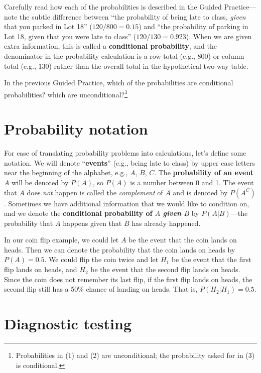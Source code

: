 \documentclass[
  10pt,
  openany]{book}
\theoremstyle{definition}
\theoremstyle{definition}
\theoremstyle{definition}
\theoremstyle{definition}
\theoremstyle{remark}
\begin{document}
Carefully read how each of the probabilities is described in the Guided Practice---note the subtle difference between ``the probability of being late to class, \emph{given} that you parked in Lot 18'' (\(120/800 = 0.15\)) and ``the probability of parking in Lot 18, given that you were late to class'' (\(120/130 = 0.923\)). When we are given extra information, this is called a \textbf{conditional probability}, and the denominator in the probability calculation is a row total (e.g., 800) or column total (e.g., 130) rather than the overall total in the hypothetical two-way table.

In the previous Guided Practice, which of the probabilities are conditional probabilities? which are unconditional?\footnote{Probabilities in (1) and (2) are unconditional; the probability asked for in (3) is conditional.}

\section{Probability notation}\label{probability-notation}

For ease of translating probability problems into calculations, let's define some notation. We will denote ``\textbf{events}'' (e.g., being late to class) by upper case letters near the beginning of the alphabet, e.g., \(A\), \(B\), \(C\). The \textbf{probability of an event} \(A\) will be denoted by \(P(A)\), so \(P(A)\) is a number between 0 and 1. The event that \(A\) does \emph{not} happen is called the \emph{complement} of \(A\) and is denoted by \(P(A^C)\). Sometimes we have additional information that we would like to condition on, and we denote the \textbf{conditional probability of \(A\) \emph{given} \(B\)} by \(P(A | B)\)---the probability that \(A\) happens given that \(B\) has already happened.

In our coin flip example, we could let \(A\) be the event that the coin lands on heads. Then we can denote the probability that the coin lands on heads by \(P(A) = 0.5\). We could flip the coin twice and let \(H_1\) be the event that the first flip lands on heads, and \(H_2\) be the event that the second flip lands on heads. Since the coin does not remember its last flip, if the first flip lands on heads, the second flip still has a 50\% chance of landing on heads. That is, \(P(H_2 | H_1) = 0.5\).

\section{Diagnostic testing}\label{diagnostic-testing}
\end{document}
